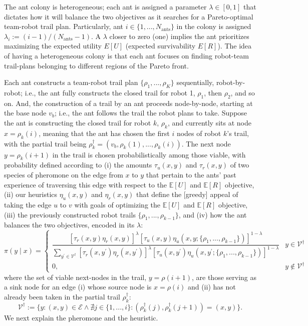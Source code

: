 \documentclass[11pt, oneside]{article}
\begin{document}
The ant colony is heterogeneous; each ant is assigned a parameter $\lambda \in [0, 1]$ that dictates how it will balance the two objectives as it searches for a Pareto-optimal team-robot trail plan. Particularly, ant $i\in\{1, ..., N_{\text{ants}}\}$ in the colony is assigned $\lambda_i := (i-1) / (N_{\text{ants}}-1)$. A $\lambda$ closer to zero (one) implies the ant prioritizes maximizing the expected utility $E[U]$ (expected survivability $E[R]$). The idea of having a heterogeneous colony is that each ant focuses on finding robot-team trail-plans belonging to different regions of the Pareto front. 

Each ant constructs a team-robot trail plan $\{\rho_1, ..., \rho_K\}$ sequentially, robot-by-robot; i.e., the ant fully constructs the closed trail for robot 1, $\rho_1$, then $\rho_2$, and so on. And, the construction of a trail by an ant proceeds node-by-node, starting at the base node $v_b$; i.e., the ant follows the trail the robot plans to take. Suppose the ant is constructing the closed trail for robot $k$, $\rho_k$, and currently sits at node $x=\rho_k(i)$, meaning that the ant has chosen the first $i$ nodes of robot $k$'s trail, with the partial trail being $\rho_k^\dagger=(v_b, \rho_k(1), ..., \rho_k(i))$. 
The next node $y=\rho_k(i+1)$ in the trail is chosen probabilistically among those viable, with probability defined according to (i) the amounts $\tau_u(x, y)$ and $\tau_r(x, y)$ of two species of pheromone on the edge from $x$ to $y$ that pertain to the ants' past experience of traversing this edge with respect to the $\mathbb{E}[U]$ and $\mathbb{E}[R]$ objective, (ii) our heuristics $\eta_u(x, y)$ and $\eta_r(x, y)$  that define the [greedy] appeal of taking the edge $u$ to $v$ with goals of optimizing the $\mathbb{E}[U]$ and $\mathbb{E}[R]$ objective, (iii) the previously constructed robot trails $\{\rho_1, ..., \rho_{k-1}\}$, and (iv) how the ant balances the two objectives, encoded in its $\lambda$:
\begin{equation}
	\pi(y \mid x) = 
	\begin{cases}
		\dfrac{
		 \left[\tau_r(x, y) \eta_r(x, y) \right]^\lambda \left[ \tau_u(x, y) \eta_u(x, y; \{\rho_1, ..., \rho_{k-1}\}) \right]^{1-\lambda} }{
		 \sum_{y^\prime \in \mathcal{V}^\dagger} \left[\tau_r(x, y^\prime) \eta_r(x, y^\prime) \right]^\lambda \left[ \tau_u(x, y^\prime) \eta_u(x, y^\prime; \{\rho_1, ..., \rho_{k-1}\}) \right]^{1-\lambda} 
		 }
		 &
		 y \in \mathcal{V}^\dagger
		  \\
		 0, & y \notin \mathcal{V}^\dagger
	\end{cases} \label{eq:prob_x_y}
\end{equation} where the set of viable next-nodes in the trail, $y=\rho(i+1)$, are those serving as a sink node for an edge (i) whose source node is $x=\rho(i)$ and (ii) has not already been taken in the partial trail $\rho_k^\dagger$:
\begin{equation}
 	\mathcal{V}^\dagger := \{ y : (x, y) \in \mathcal{E} \land \nexists j \in \{1, ..., i\} : (\rho_k^\dagger(j), \rho_k^\dagger(j+1))= (x, y)  \}.
\end{equation}
We next explain the pheromone and the heuristic.
\end{document}
